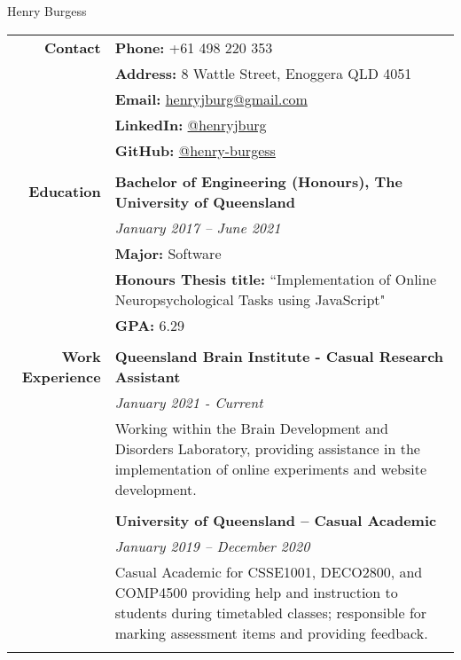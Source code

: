 \documentclass[a4paper]{article}
\begin{document}
\begin{center}
	\Huge{Henry Burgess}
\end{center}

\begin{longtable}{r p{13.5cm}} 
	\textbf{Contact} 		   \vline &	   \textbf{Phone:}  +61 498 220 353 \\ 
										\vline &	\textbf{Address:} 8 Wattle Street, Enoggera QLD 4051 \\
										\vline &	\textbf{Email:} \href{mailto:henryjburg@gmail.com}{henryjburg@gmail.com} \\
										\vline &	\textbf{LinkedIn:} \href{https://www.linkedin.com/in/henryjburg/}{@henryjburg} \\
										\vline &	\textbf{GitHub:} \href{https://github.com/henry-burgess}{@henry-burgess} \\
										\vline & \\
										
	\textbf{Education} 		\vline & \textbf{Bachelor of Engineering (Honours), The University of Queensland} \\
										\vline & \textit{January 2017 – June 2021} \\
										\vline & \textbf{Major:} Software \\
										\vline & \textbf{Honours Thesis title:} ``Implementation of Online Neuropsychological Tasks using JavaScript" \\
										\vline & \textbf{GPA:} 6.29 \\
										\vline & \\
										
	\textbf{Work Experience} 	  \vline & \textbf{Queensland Brain Institute - Casual Research Assistant} \\
										\vline & \textit{January 2021 - Current} \\
										\vline & Working within the Brain Development and Disorders Laboratory, providing assistance in the implementation of online experiments and website development. \\ 
										\vline & \\
	
	 									\vline & \textbf{University of Queensland – Casual Academic} \\
										\vline & \textit{January 2019 – December 2020} \\
										\vline & Casual Academic for CSSE1001, DECO2800, and COMP4500 providing help and instruction to students during timetabled classes; responsible for marking assessment items and providing feedback. \\ 
										\vline & \\
										

\end{longtable}
\end{document}
